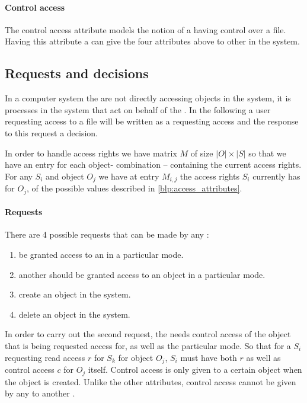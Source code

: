\paragraph{Control access}
The control access attribute models the notion of a \ssubject{} having control over a file.
Having this attribute a \ssubject{} can give the four attributes above to other \subjects{} in the system.

\subsection{Requests and decisions}
In a computer system the \subjects{} are not directly accessing objects in the system, it is processes in the system that act on behalf of the \ssubject{}.
In the following a user requesting access to a file will be written as a \ssubject{} requesting access and the response to this request a decision.

In order to handle access rights we have matrix $M$ of size $|O| \times |S|$ so that we have an entry for each object-\ssubject{} combination -- containing the current access rights.
For any \ssubject{} $S_i$ and object $O_j$ we have at entry $M_{i,j}$ the access rights $S_i$ currently has for $O_j$, of the possible values described in \cref{blp:access_attributes}.

\paragraph{Requests}
There are 4 possible requests that can be made by any \ssubject{}:
\begin{enumerate}
  \item be granted access to an \ssubject{} in a particular mode.
  \item another \ssubject{} should be granted access to an object in a particular mode.
  \item create an object in the system.
  \item delete an object in the system.
\end{enumerate}

In order to carry out the second request, the \ssubject{} needs control access of the object that is being requested access for, as well as the particular mode.
So that for a \ssubject{} $S_i$ requesting read access $r$ for \ssubject{} $S_k$ for object $O_j$, $S_i$ must have both $r$ as well as control access $c$ for $O_j$ itself.
Control access is only given to a certain object when the object is created.
Unlike the other attributes, control access cannot be given by any \ssubject{} to another \ssubject{}.

